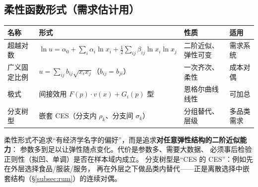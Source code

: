 \subsection{柔性函数形式（需求估计用）}\label{subsec:flexible}

\begin{center}
\footnotesize
\setlength{\tabcolsep}{4pt}
\begin{tabular}{llll}
\toprule
名称 & 形式 & 性质 & 适用 \\
\midrule
超越对数 & $\ln u=\alpha_0+\sum_i\alpha_i\ln x_i+\frac12\sum_{ij}\beta_{ij}\ln x_i\ln x_j$ & 二阶近似、弹性可变 & 需求系统 \\
广义固定比例 & $u=\sum_{ij}b_{ij}\sqrt{x_ix_j}$（$b_{ij}=b_{ji}$） & 一次齐次、柔性 & 成本对偶 \\
极式 & 间接效用 $F(p)\cdot v(x)+G_i(p)$ 型 & 恩格尔曲线线性 & 可加总 \\
分支树型 & 嵌套 CES（分支内 $\rho_k$、分支间 $\sigma_k$） & 分组替代、层级 & 多品类需求 \\
\bottomrule
\end{tabular}
\end{center}

柔性形式不追求“有经济学名字的偏好”，而是追求\textbf{对任意弹性结构的二阶近似能力}：
参数多到足以让弹性随点变化。代价是参数多、需要大数据、
必须事后检验正则性（拟凹、单调）是否在样本域内成立。
分支树型是“CES 的 CES”：例如先在外层选择食品/服装/服务，
再在外层之下做品类内替代——正是离散选择中嵌套结构（§\ref{subsec:rum}）的连续对偶。
